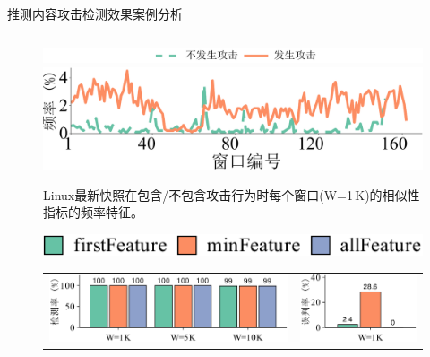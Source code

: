 \documentclass{beamer}
\begin{document}
\begin{frame}{推测内容攻击检测效果案例分析}
    \begin{columns}
        \begin{column}{.6\textwidth}
            \vspace{-1em}
            \begin{figure}[!htb]
                \centering
                \includegraphics[width=\linewidth]{../pic/featurespy/plot/detection/overall/prefixDistribution_legend.pdf}\\
                \includegraphics[width=\linewidth]{../pic/featurespy/plot/detection/overall/prefixDistribution-1000-Linux-min.pdf}\\
                \caption{Linux最新快照在包含/不包含攻击行为时每个窗口(W=1\,K)的相似性指标的频率特征。}
                \label{fig:featurespy-expDetectionOverall}
            \end{figure}
            \vspace{-2em}
            \begin{figure}[!htb]
                \centering
                \includegraphics[width=0.66\linewidth]{../pic/featurespy/plot/detection/overall/effectiveness-falsePositive_legend.pdf}
                \vspace{5pt}\\
                \begin{tabular}{@{\ }c@{\ }c}
                    \includegraphics[width=0.66\linewidth]{../pic/featurespy/plot/detection/overall/effectivenessLinux.pdf} &
                    \includegraphics[width=0.33\linewidth]{../pic/featurespy/plot/detection/overall/falsePositiveLinux.pdf}   \\

\end{tabular}
\end{figure}
\end{column}
\end{columns}
\end{frame}
\end{document}
